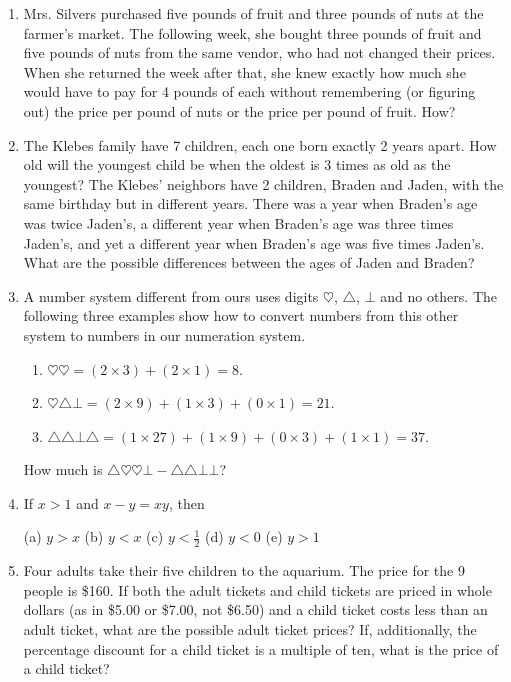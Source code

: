 \begin{enumerate}
	\item Mrs. Silvers purchased five pounds of fruit and three pounds of nuts at the farmer's market. The following week, she bought three pounds of fruit and five pounds of nuts from the same vendor, who had not changed their prices. When she returned the week after that, she knew exactly how much she would have to pay for 4 pounds of each without remembering (or figuring out) the price per pound of nuts or the price per pound of fruit. How?
	
	\item The Klebes family have 7 children, each one born exactly 2 years apart. How old will the youngest child be when the oldest is 3 times as old as the youngest? The Klebes' neighbors have 2 children, Braden and Jaden, with the same birthday but in different years. There was a year when Braden's age was twice Jaden's, a different year when Braden's age was three times Jaden's, and yet a different year when Braden's age was five times Jaden's. What are the possible differences between the ages of Jaden and Braden?
	
	\item A number system different from ours uses digits $\heartsuit$, $\triangle$, $\bot$ and no others. The following three examples show how to convert numbers from this other system to numbers in our numeration system. 
	\begin{enumerate}
		\item $\heartsuit\heartsuit=(2\times3)+(2\times1)=8$.
		\item $\heartsuit\triangle\bot=(2\times9)+(1\times3)+(0\times1)=21$.
		\item $\triangle\triangle\bot\triangle=(1\times27)+(1\times9)+(0\times3)+(1\times1)=37$.
	\end{enumerate}
	How much is $\triangle\heartsuit\heartsuit\bot-\triangle\triangle\bot\bot$?
	
	\item If $x>1$ and $x-y=xy$, then \par
	(a) $y>x$ \hfill{}(b) $y<x$ \hfill{}(c) $y<\frac{1}{2}$ \hfill{}(d) $y<0$ \hfill{}(e) $y>1$\hfill{}$\ $
	
	\item Four adults take their five children to the aquarium. The price for the 9 people is \$160. If both the adult tickets and child tickets are priced in whole dollars (as in \$5.00 or \$7.00, not \$6.50) and a child ticket costs less than an adult ticket, what are the possible adult ticket prices? If, additionally, the percentage discount for a child ticket is a multiple of ten, what is the price of a child ticket?
	

\end{enumerate}
